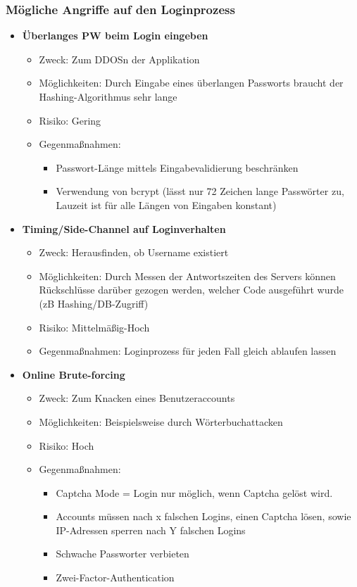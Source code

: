 \documentclass[12pt,DIV14,BCOR10mm,a4paper,twoside,parskip=half-,headsepline,headinclude,english,ngerman,bibliography=totocnumbered]{scrreprt}
\begin{document}
\subsubsection{Mögliche Angriffe auf den Loginprozess}

\begin{itemize}
  \item \textbf{Überlanges PW beim Login eingeben}
  \begin{itemize}
  \item Zweck: Zum DDOSn der Applikation
  \item Möglichkeiten: Durch Eingabe eines überlangen Passworts braucht der Hashing-Algorithmus sehr lange
  \item Risiko: Gering
  \item Gegenmaßnahmen: 
  \begin{itemize}
  \item Passwort-Länge mittels Eingabevalidierung beschränken
  \item Verwendung von bcrypt (lässt nur 72 Zeichen lange Passwörter zu, Lauzeit ist für alle Längen von Eingaben konstant)  
  \end{itemize}
\end{itemize}

  \item \textbf{Timing/Side-Channel auf Loginverhalten}
  \begin{itemize}
  \item Zweck: Herausfinden, ob Username existiert
  \item Möglichkeiten: Durch Messen der Antwortszeiten des Servers können Rückschlüsse darüber gezogen werden, welcher Code ausgeführt wurde (zB Hashing/DB-Zugriff)
  \item Risiko: Mittelmäßig-Hoch
  \item Gegenmaßnahmen: Loginprozess für jeden Fall gleich ablaufen lassen
  \end{itemize}

  \item \textbf{Online Brute-forcing}
  \begin{itemize}
  \item Zweck: Zum Knacken eines Benutzeraccounts
  \item Möglichkeiten: Beispielsweise durch Wörterbuchattacken
  \item Risiko: Hoch
  \item Gegenmaßnahmen:
  \begin{itemize}
      \item Captcha Mode = Login nur möglich, wenn Captcha gelöst wird.
      \item Accounts müssen nach x falschen Logins, einen Captcha lösen, sowie IP-Adressen sperren nach Y falschen Logins
      \item Schwache Passworter verbieten
      \item Zwei-Factor-Authentication
    \end{itemize}
  \end{itemize}
\end{itemize}
\end{document}

